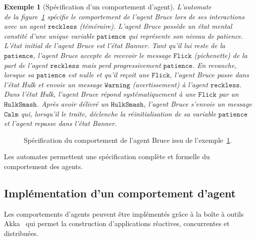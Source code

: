 \documentclass[a4paper, 11pt]{article}
\newtheorem{exemple}{Exemple}
\begin{document}
\begin{exemple}[Spécification d'un comportement d'agent]
  \label{ex:hulk}
  L'automate\\ de la figure~\ref{fig:hulk} spécifie le comportement de
  l'agent Bruce lors de ses interactions avec un agent
  $\texttt{reckless}$ (téméraire). L'agent Bruce possède un état
  mental constité d'une unique variable $\texttt{patience}$ qui
  représente son niveau de patience. L'état initial de l'agent Bruce
  est l'état \emph{Banner}. Tant qu'il lui reste de la
  $\texttt{patience}$, l'agent Bruce accepte de recevoir le message
  $\texttt{Flick}$ (pichenette) de la part de l'agent
  $\texttt{reckless}$ mais perd progressivement
  $\texttt{patience}$. En revanche, lorsque sa $\texttt{patience}$ est
  nulle et qu'il reçoit une $\texttt{Flick}$, l'agent Bruce passe dans
  l'état \emph{Hulk} et envoie un message $\texttt{Warning}$ (avertissement) à
  l'agent $\texttt{reckless}$. Dans l'état \emph{Hulk}, l'agent Bruce
  répond systématiquement à une $\texttt{Flick}$ par un
  $\texttt{HulkSmash}$. Après avoir délivré un $\texttt{HulkSmash}$,
  l'agent Bruce s'envoie un message $\texttt{Calm}$ qui, lorsqu'il
  le traite, déclenche la réinitialisation de sa variable
  $\texttt{patience}$ et l'agent repasse dans l'état \emph{Banner}.
\end{exemple}

\begin{figure}[h!]
  \centering
  
  \caption{Spécification du comportement de l'agent Bruce issu de
    l'exemple~\ref{ex:hulk}.}
  \label{fig:hulk}
\end{figure}

Les automates permettent une spécification complète et formelle du
comportement des agents.

\subsection*{Implémentation d'un comportement d'agent}

Les comportements d'agents peuvent être implémentés grâce à la boîte à
outils Akka~\citep{akka} qui permet la construction d'applications
réactives, concurrentes et distribuées.
\end{document}
